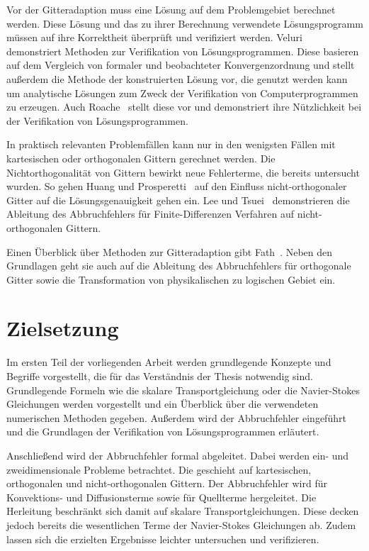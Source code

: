 Vor der Gitteradaption muss eine Lösung auf dem Problemgebiet berechnet werden. Diese
Lösung und das zu ihrer Berechnung verwendete Lösungsprogramm müssen
auf ihre Korrektheit überprüft und verifiziert werden. Veluri~\cite{veluri} demonstriert
Methoden zur Verifikation von Lösungsprogrammen. Diese basieren auf dem Vergleich von formaler und beobachteter
Konvergenzordnung und stellt außerdem die Methode der konstruierten Lösung vor, die genutzt werden kann
um analytische Lösungen zum Zweck der Verifikation von Computerprogrammen zu erzeugen.
Auch Roache~\cite{roache} stellt diese vor und demonstriert ihre Nützlichkeit bei der Verifikation von
Lösungsprogrammen.

In praktisch relevanten Problemfällen kann nur in den wenigsten Fällen mit
kartesischen oder orthogonalen Gittern gerechnet werden. Die Nichtorthogonalität
von Gittern bewirkt neue Fehlerterme, die bereits untersucht wurden. So gehen
Huang und Prosperetti~\cite{grid_ortho} auf den Einfluss nicht-orthogonaler Gitter
auf die Lösungsgenauigkeit gehen 
ein. Lee und Tsuei~\cite{lee} demonstrieren die Ableitung des Abbruchfehlers für Finite-Differenzen Verfahren
auf nicht-orthogonalen Gittern.

Einen Überblick über Methoden zur Gitteradaption gibt Fath~\cite{fath}.
Neben den Grundlagen geht sie auch auf die Ableitung des Abbruchfehlers für
orthogonale Gitter sowie die Transformation von physikalischen zu logischen Gebiet ein.



\section{Zielsetzung}

Im ersten Teil der vorliegenden Arbeit werden grundlegende Konzepte und Begriffe vorgestellt,
die für das Verständnis der Thesis notwendig sind. Grundlegende Formeln wie
die skalare Transportgleichung oder die Navier-Stokes Gleichungen werden vorgestellt
und ein Überblick über die verwendeten numerischen Methoden gegeben. Außerdem
wird der Abbruchfehler eingeführt und die Grundlagen der Verifikation von
Lösungsprogrammen erläutert.

Anschließend wird der Abbruchfehler formal
abgeleitet. Dabei werden ein- und zweidimensionale Probleme betrachtet.
 Die geschieht auf kartesischen, orthogonalen
und nicht-orthogonalen Gittern. Der Abbruchfehler wird für Konvektions-
und Diffusionsterme sowie für Quellterme hergeleitet. Die Herleitung beschränkt sich damit auf
skalare Transportgleichungen. Diese decken jedoch bereits die wesentlichen Terme der Navier-Stokes Gleichungen
ab. Zudem lassen sich die erzielten Ergebnisse leichter untersuchen und verifizieren.

